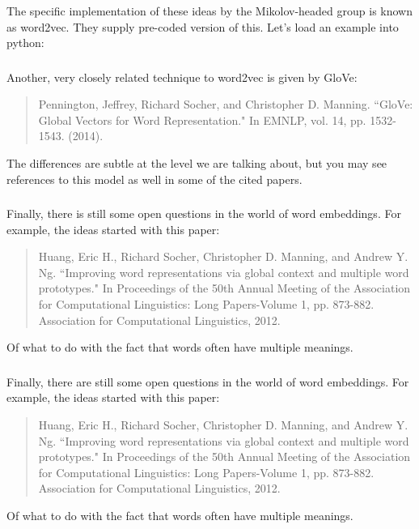 \documentclass[xetex,mathserif,serif,aspectratio=169]{beamer}
\begin{document}
\begin{frame}[fragile] \frametitle{} \oldB \small

The specific implementation of these ideas by the Mikolov-headed
group is known as word2vec. They supply pre-coded version of this.
Let's load an example into python:


\end{frame}

\begin{frame}[fragile] \frametitle{} \oldB \small

Another, very closely related technique to word2vec is given
by GloVe:
\begin{quote}
Pennington, Jeffrey, Richard Socher, and Christopher D. Manning.
``GloVe: Global Vectors for Word Representation."
In EMNLP, vol. 14, pp. 1532-1543. (2014).
\end{quote}
The differences are subtle at the level we are talking about,
but you may see references to this model as well in some of the
cited papers.

\end{frame}

\begin{frame}[fragile] \frametitle{} \oldB \small

Finally, there is still some open questions in the world of
word embeddings. For example, the ideas started with this
paper:
\begin{quote}
Huang, Eric H., Richard Socher, Christopher D. Manning, and
Andrew Y. Ng. ``Improving word representations via global
context and multiple word prototypes." In Proceedings of the
50th Annual Meeting of the Association for
Computational Linguistics: Long Papers-Volume 1, pp. 873-882.
Association for Computational Linguistics, 2012.
\end{quote}
Of what to do with the fact that words often have multiple
meanings.

\end{frame}

\begin{frame}[fragile] \frametitle{} \oldB \small

Finally, there are still some open questions in the world of
word embeddings. For example, the ideas started with this
paper:
\begin{quote}
Huang, Eric H., Richard Socher, Christopher D. Manning, and
Andrew Y. Ng. ``Improving word representations via global
context and multiple word prototypes." In Proceedings of the
50th Annual Meeting of the Association for
Computational Linguistics: Long Papers-Volume 1, pp. 873-882.
Association for Computational Linguistics, 2012.
\end{quote}
Of what to do with the fact that words often have multiple
meanings.

\end{frame}
\end{document}
